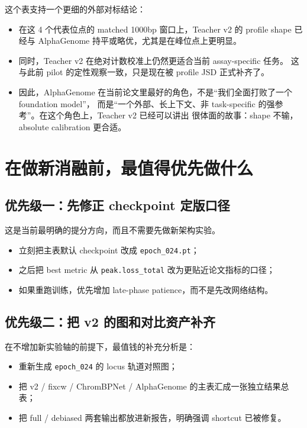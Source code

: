 \documentclass[11pt,a4paper]{ctexart}
\begin{document}
这个表支持一个更细的外部对标结论：
\begin{itemize}[leftmargin=2em]
  \item 在这 4 个代表位点的 matched 1000bp 窗口上，Teacher v2 的 profile shape 已经与
  AlphaGenome 持平或略优，尤其是在峰位点上更明显。

  \item 同时，Teacher v2 在绝对计数校准上仍然更适合当前 assay-specific 任务。
  这与此前 pilot 的定性观察一致，只是现在被 profile JSD 正式补齐了。

  \item 因此，AlphaGenome 在当前论文里最好的角色，不是“我们全面打败了一个 foundation model”，
  而是“一个外部、长上下文、非 task-specific 的强参考”。在这个角色上，Teacher v2 已经可以讲出
  很体面的故事：shape 不输，absolute calibration 更合适。
\end{itemize}

\section{在做新消融前，最值得优先做什么}

\subsection{优先级一：先修正 checkpoint 定版口径}

这是当前最明确的提分方向，而且不需要先做新架构实验。

\begin{itemize}[leftmargin=2em]
  \item 立刻把主表默认 checkpoint 改成 \texttt{epoch\_024.pt}；
  \item 之后把 best metric 从 \texttt{peak.loss\_total} 改为更贴近论文指标的口径；
  \item 如果重跑训练，优先增加 late-phase patience，而不是先改网络结构。
\end{itemize}

\subsection{优先级二：把 v2 的图和对比资产补齐}

在不增加新实验轴的前提下，最值钱的补充分析是：
\begin{itemize}[leftmargin=2em]
  \item 重新生成 \texttt{epoch\_024} 的 locus 轨道对照图；
  \item 把 v2 / fixcw / ChromBPNet / AlphaGenome 的主表汇成一张独立结果总表；
  \item 把 full / debiased 两套输出都放进新报告，明确强调 shortcut 已被修复。
\end{itemize}
\end{document}
